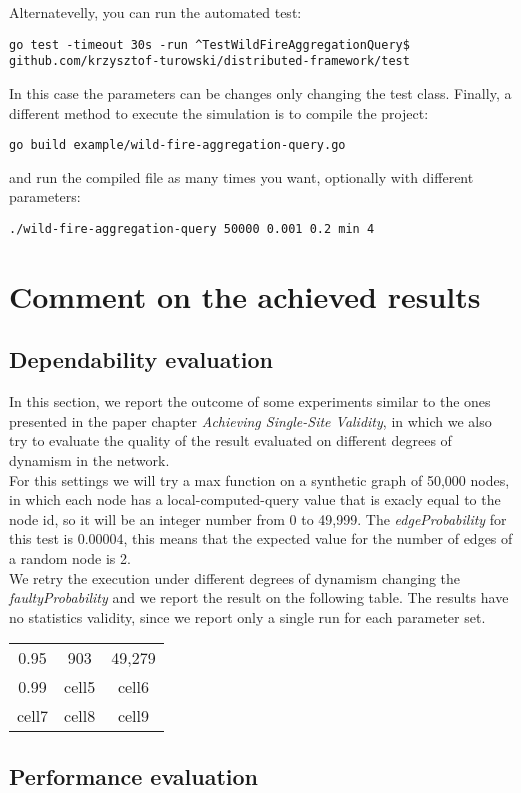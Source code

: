 \documentclass{article}
\begin{document}
Alternatevelly, you can run the automated test:
\begin{verbatim}
go test -timeout 30s -run ^TestWildFireAggregationQuery$ 
github.com/krzysztof-turowski/distributed-framework/test
\end{verbatim}
In this case the parameters can be changes only changing the test class.
Finally, a different method to execute the simulation is to compile the project:
\begin{verbatim}
go build example/wild-fire-aggregation-query.go 
\end{verbatim}
and run the compiled file as many times you want, optionally with different parameters:
\begin{verbatim}
./wild-fire-aggregation-query 50000 0.001 0.2 min 4
\end{verbatim}

\section{Comment on the achieved results}
\subsection{Dependability evaluation}
In this section, we report the outcome of some experiments similar to the ones presented in the paper chapter \emph{Achieving Single-Site Validity}, in which we also try to evaluate the quality of the result evaluated on different degrees of dynamism in the network. \\
For this settings we will try a max function on a synthetic graph of 50,000 nodes, in which each node has a local-computed-query value that is exacly equal to the node id, so it will be an integer number from 0 to 49,999.
The \emph{edgeProbability} for this test is 0.00004, this means that the expected value for the number of edges of a random node is 2. \\
We retry the execution under different degrees of dynamism changing the \emph{faultyProbability} and we report the result on the following table.
The results have no statistics validity, since we report only a single run for each parameter set.

\begin{center}
\begin{tabular}{ c c c }
 0.95 & 903 & 49,279 \\ 
 0.99 & cell5 & cell6 \\  
 cell7 & cell8 & cell9    
\end{tabular}
\end{center}

\subsection{Performance evaluation}
\end{document}
